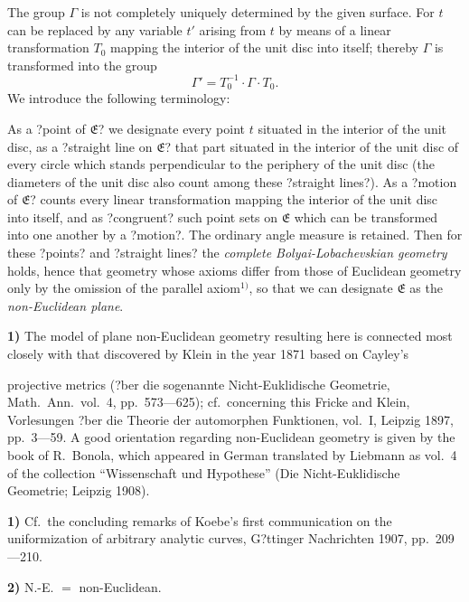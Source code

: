 \documentclass{article}
\begin{document}
The group $\varGamma$ is not completely uniquely determined by the given surface. For $t$ can be replaced by any variable $t'$ arising from $t$ by means of a linear transformation $T_0$ mapping the interior of the unit disc into itself; thereby $\varGamma$ is transformed into the group
\[ \varGamma' = T_0^{-1} \cdot \varGamma \cdot T_0. \]
We introduce the following terminology:

As a ?point of $\mathfrak{E}$? we designate every point $t$ situated in the interior of the unit disc, as a ?straight line on $\mathfrak{E}$? that part situated in the interior of the unit disc of every circle which stands perpendicular to the periphery of the unit disc (the diameters of the unit disc also count among these ?straight lines?). As a ?motion of $\mathfrak{E}$? counts every linear transformation mapping the interior of the unit disc into itself, and as ?congruent? such point sets on $\mathfrak{E}$ which can be transformed into one another by a ?motion?. The ordinary angle measure is retained. Then for these ?points? and ?straight lines? the \emph{complete Bolyai-Lobachevskian geometry} holds, hence that geometry whose axioms differ from those of Euclidean geometry only by the omission of the parallel axiom${}^{1)}$, so that we can designate $\mathfrak{E}$ as the \emph{non-Euclidean plane}.

\textbf{1)} The model of plane non-Euclidean geometry resulting here is connected most closely with that discovered by Klein in the year 1871 based on Cayley's

projective metrics (?ber die sogenannte Nicht-Euklidische Geometrie, Math.\ Ann.\ vol.~4, pp.~573---625); cf.\ concerning this Fricke and Klein, Vorlesungen ?ber die Theorie der automorphen Funktionen, vol.~I, Leipzig 1897, pp.~3---59. A good orientation regarding non-Euclidean geometry is given by the book of R.~Bonola, which appeared in German translated by Liebmann as vol.~4 of the collection ``Wissenschaft und Hypothese'' (Die Nicht-Euklidische Geometrie; Leipzig 1908).

\textbf{1)} Cf.\ the concluding remarks of Koebe's first communication on the uniformization of arbitrary analytic curves, G?ttinger Nachrichten 1907, pp.~209---210.

\textbf{2)} N.-E. $=$ non-Euclidean.
\end{document}
